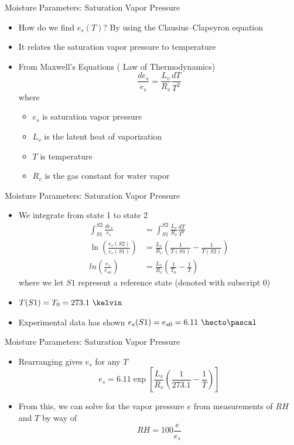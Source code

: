 
\begin{frame}{Moisture Parameters: Saturation Vapor Pressure}
\begin{itemize}
	\item How do we find $e_s(T)$? By using the Clausius–Clapeyron equation
	\item It relates the saturation vapor pressure to temperature
	\item From Maxwell's Equations ( Law of Thermodynamics)
	$$\frac{de_s}{e_s} = \frac{L_v}{R_v} \frac{dT}{T^2}$$
	where
	\begin{itemize}
		\item $e_s$ is saturation vapor pressure
		\item $L_v$ is the latent heat of vaporization
		\item $T$ is temperature
		\item $R_v$ is the gas constant for water vapor
	\end{itemize}
\end{itemize}
\end{frame}


\begin{frame}{Moisture Parameters: Saturation Vapor Pressure}
\begin{itemize}
	\item We integrate from state 1 to state 2
	\begin{align*}
		\int^{S2}_{S1}\frac{de_s}{e_s} &= \int^{S2}_{S1}\frac{L_v}{R_v} \frac{dT}{T^2}\\
		\ln\left(\frac{e_s(S2)}{e_s(S1)}\right) &= \frac{L_v}{R_v}\left(\frac{1}{T(S1)} - \frac{1}{T(S2)}\right)\\
		ln\left(\frac{e_s}{e_{s0}}\right) &= \frac{L_v}{R_v}\left(\frac{1}{T_0} - \frac{1}{T}\right)
	\end{align*}
	where we let $S1$ represent a reference state (denoted with  subscript 0)
	\item $T(S1)=T_0=273.1\ \kelvin$
	\item Experimental data has shown $e_s(S1)=e_{s0}=6.11\ \hecto\pascal$
\end{itemize}
\end{frame}


\begin{frame}{Moisture Parameters: Saturation Vapor Pressure}
\begin{itemize}
	\item Rearranging gives $e_s$ for any $T$
	$$e_s = 6.11\exp \left[ \frac{L_v}{R_v}\left(\frac{1}{273.1} - \frac{1}{T}\right)\right]$$
	\item From this, we can solve for the vapor pressure $e$ from measurements of $RH$ and $T$ by way of
	$$RH=100\frac{e}{e_s}$$
\end{itemize}
\end{frame}

